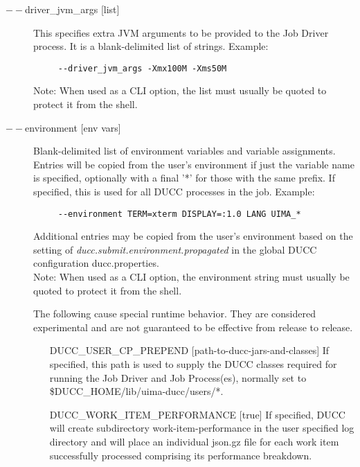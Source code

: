 \begin{description}
           \item[$--$driver\_jvm\_args {[list]} ]
             This specifies extra JVM arguments to be provided to the Job Driver process. It is a blank-delimited 
             list of strings. Example: 
             \begin{verbatim}
     --driver_jvm_args -Xmx100M -Xms50M
             \end{verbatim}
             Note: When used as a CLI option, the list must usually be
             quoted to protect it from the shell.

           \item[$--$environment {[env vars]}] Blank-delimited list of environment variables and
             variable assignments. 
             Entries will be copied from the user's environment if just the variable name is
             specified, optionally with a final '*' for those with the same prefix.
             If specified, this is used for all DUCC processes in the job. Example:
             \begin{verbatim}
     --environment TERM=xterm DISPLAY=:1.0 LANG UIMA_*
             \end{verbatim}
             Additional entries may be copied from the user's environment based on the setting of
             {\em ducc.submit.environment.propagated}
             in the global DUCC configuration ducc.properties.
             \\Note: When used as a CLI option, the environment string must usually be
             quoted to protect it from the shell.

   
             The following cause special runtime behavior. 
             They are considered experimental and are not guaranteed 
             to be effective from release to release.
             
  \begin{enumerate}
  
    \item[DUCC\_USER\_CP\_PREPEND {[path-to-ducc-jars-and-classes]}  ]
    If specified, this path is used to supply the DUCC classes required for running
    the Job Driver and Job Process(es), normally set to \$DUCC\_HOME/lib/uima-ducc/users/*.
    
    \item[DUCC\_WORK\_ITEM\_PERFORMANCE {[true]}  ]
    If specified, DUCC will create subdirectory work-item-performance in the user 
    specified log directory and will place an individual json.gz file for each 
    work item successfully processed comprising its performance breakdown.
    

\end{enumerate}
\end{description}
